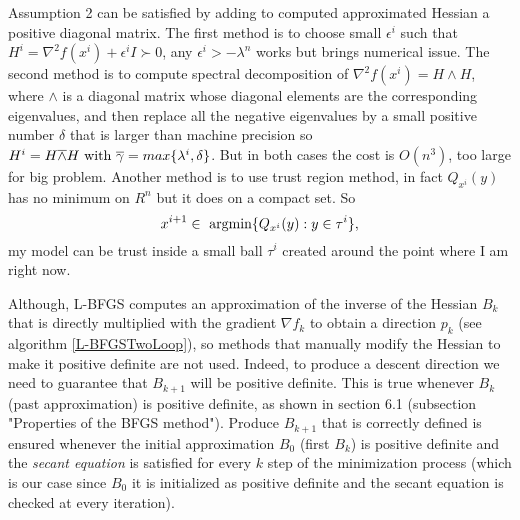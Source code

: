 Assumption 2 can be satisfied by adding to computed approximated Hessian a positive diagonal matrix.
The first method is to choose small $\epsilon^i$ such that $H^i=\nabla^2f(x^i) + \epsilon^iI\succ0$, any $\epsilon^i>-\lambda^n$ works but brings numerical issue. 
The second method is to compute spectral decomposition of $\nabla^2f(x^i)=H\wedge H$, where $\wedge$ is a diagonal matrix whose diagonal elements are the corresponding eigenvalues, and then replace all the negative eigenvalues by a small positive number $\delta$ that is larger than machine precision so $H^i=H\overline{\wedge}H \textnormal{ with } \overline{\gamma}=max\{\lambda^i,\delta\}$. But in both cases the cost is $O(n^3)$, too large for big problem. Another method is to use trust region method, in fact $Q_{x^i}(y)$ has no minimum on $R^n$ but it does on a compact set. So 
\begin{equation}
x^{i+1} \in \textnormal{ argmin}\{Q_{x^i}(y):y\in \tau^i\},
\end{equation}
my model can be trust inside a small ball $\tau^i$ created around the point where I am right now.

Although, L-BFGS computes an approximation of the inverse of the Hessian $B_{k}$ that is directly multiplied with the gradient $\nabla f_{k}$ to obtain a direction $p_{k}$ (see algorithm \ref{L-BFGSTwoLoop}), so methods that manually modify the Hessian to make it positive definite are not used. Indeed, to produce a descent direction we need to guarantee that $B_{k+1}$  will be positive definite. This is true whenever $B_{k}$ (past approximation) is positive definite, as shown in \cite{numerical} section 6.1 (subsection "Properties of the BFGS method"). Produce $B_{k+1}$ that is correctly defined is ensured whenever the initial approximation $B_{0}$ (first $B_{k}$) is positive definite and the \textit{secant equation} is satisfied for every $k$ step of the minimization process (which is our case since $B_{0}$ it is initialized as positive definite and the secant equation is checked at every iteration). 

